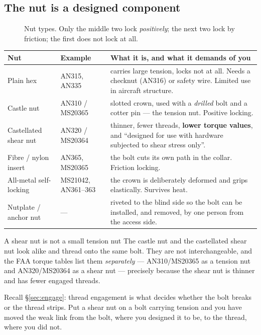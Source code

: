 \documentclass[11pt,a4paper]{article}
\begin{document}
\subsection{The nut is a designed component}

\begin{figure}[H]\centering
\resizebox{\textwidth}{!}{}
\caption{Nut types. Only the middle two lock \emph{positively}; the next two lock by friction; the
first does not lock at all.}
\label{fig:nuts}
\end{figure}

\begin{center}\footnotesize
\begin{tabular}{@{}p{3.0cm}p{2.4cm}p{8.4cm}@{}}
\toprule
Nut & Example & What it is, and what it demands of you\\
\midrule
Plain hex & AN315, AN335 & carries large tension, locks not at all. Needs a checknut (AN316) or
  safety wire. Limited use in aircraft structure.\\[2pt]
Castle nut & AN310 / MS20365 & slotted crown, used with a \emph{drilled} bolt and a cotter pin ---
  the tension nut. Positive locking.\\[2pt]
Castellated shear nut & AN320 / MS20364 & thinner, fewer threads, \textbf{lower torque values}, and
  ``designed for use with hardware subjected to shear stress only''.\\[2pt]
Fibre / nylon insert & AN365, MS20365 & the bolt cuts its own path in the collar. Friction locking.\\[2pt]
All-metal self-locking & MS21042, AN361--363 & the crown is deliberately deformed and grips
  elastically. Survives heat.\\[2pt]
Nutplate / anchor nut & --- & riveted to the blind side so the bolt can be installed, and removed,
  by one person from the access side.\\
\bottomrule
\end{tabular}
\end{center}

\begin{keybox}{A shear nut is not a small tension nut}
The castle nut and the castellated shear nut look alike and thread onto the same bolt. They are not
interchangeable, and the FAA torque tables list them \emph{separately} --- AN310/MS20365 as a tension
nut and AN320/MS20364 as a shear nut --- precisely because the shear nut is thinner and has fewer
engaged threads.

\medskip
Recall \S\ref{sec:engage}: thread engagement is what decides whether the bolt breaks or the thread
strips. Put a shear nut on a bolt carrying tension and you have moved the weak link from the bolt,
where you designed it to be, to the thread, where you did not.
\end{keybox}
\end{document}
